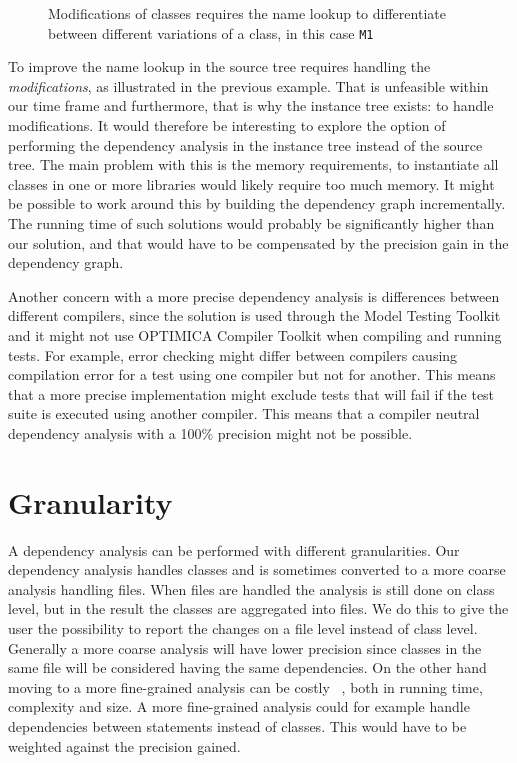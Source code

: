 \documentclass{cslthse-msc}
\begin{document}
\begin{figure}[htbp]
    \centering
    \raisebox{4.0 cm}{}
    \caption{Modifications of classes requires the name lookup to differentiate between different variations of a class, in this case \texttt{M1}}
    \label{fig:betterLookup}
\end{figure}

To improve the name lookup in the source tree requires handling the \emph{modifications}, as illustrated in the previous example. That is unfeasible within our time frame and furthermore, that is why the instance tree exists: to handle modifications. It would therefore be interesting to explore the option of performing the dependency analysis in the instance tree instead of the source tree. The main problem with this is the memory requirements, to instantiate all classes in one or more libraries would likely require too much memory. It might be possible to work around this by building the dependency graph incrementally. The running time of such solutions would probably be significantly higher than our solution, and that would have to be compensated by the precision gain in the dependency graph. 

Another concern with a more precise dependency analysis is differences between different compilers, since the solution is used through the Model Testing Toolkit and it might not use OPTIMICA Compiler Toolkit  when compiling and running tests. For example, error checking might differ between compilers causing compilation error for a test using one compiler but not for another. This means that a more precise implementation might exclude tests that will fail if the test suite is executed using another compiler. This means that a compiler neutral dependency analysis with a 100\% precision might not be possible. 



\section{Granularity}
A dependency analysis can be performed with different granularities. Our dependency analysis handles classes and is sometimes converted to a more coarse analysis handling files. When files are handled the analysis is still done on class level, but in the result the classes are aggregated into files. We do this to give the user the possibility to report the changes on a file level instead of class level. Generally a more coarse analysis will have lower precision since classes in the same file will be considered having the same dependencies. On the other hand moving to a more fine-grained analysis can be costly ~\cite{DBLP:conf/sigsoft/LegunsenHSLZM16}, both in running time, complexity and size. A more fine-grained analysis could for example handle dependencies between statements instead of classes. This would have to be weighted against the precision gained.
\end{document}
